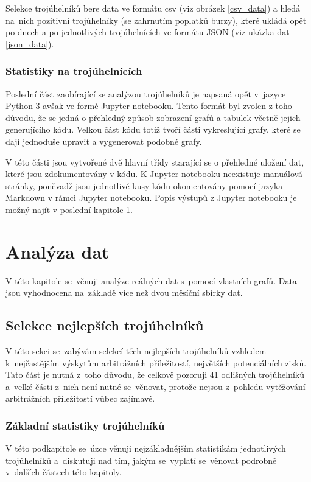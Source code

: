 \documentclass[thesis=B,czech]{FITthesis}[2019/03/21]
\begin{document}
Selekce trojúhelníků bere data ve formátu csv (viz obrázek \ref{csv_data}) a hledá na~nich pozitivní trojúhelníky (se zahrnutím poplatků burzy), které ukládá opět po dnech a po jednotlivých trojúhelnících ve formátu JSON (viz ukázka dat \ref{json_data}).

\subsection{Statistiky na trojúhelnících}
Poslední část zaobírající se analýzou trojúhelníků je napsaná opět v~jazyce Python 3 avšak ve formě Jupyter notebooku. Tento formát byl zvolen z toho důvodu, že se jedná o přehledný způsob zobrazení grafů a tabulek včetně jejich generujícího kódu. Velkou část kódu totiž tvoří části vykreslující grafy, které se dají jednoduše upravit a vygenerovat podobné grafy.

V této části jsou vytvořené dvě hlavní třídy starající se o přehledné uložení dat, které jsou zdokumentovány v kódu. K Jupyter notebooku neexistuje manuálová stránky, poněvadž jsou jednotlivé kusy kódu okomentovány pomocí jazyka Markdown v rámci Jupyter notebooku. Popis výstupů z Jupyter notebooku je možný najít v poslední kapitole \ref{chapter:analyza_dat}.



\chapter{Analýza dat}
\label{chapter:analyza_dat}
V této kapitole se~věnuji analýze  reálných dat s~pomocí vlastních grafů. Data jsou vyhodnocena na~základě více než dvou měsíční sbírky dat.

\section{Selekce nejlepších trojúhelníků}
V této sekci se~zabývám selekcí těch nejlepších trojúhelníků vzhledem \linebreak k~nejčastějším výskytům arbitrážních příležitostí, největších potenciálních \linebreak zisků. Tato část je nutná z~toho důvodu, že celkově pozoruji 41 odlišných trojúhelníků a~velké části z~nich není nutné se~věnovat, protože nejsou z~pohledu vytěžování arbitrážních příležitostí vůbec zajímavé.

\subsection{Základní statistiky trojúhelníků}
V této podkapitole se~úzce věnuji nejzákladnějším statistikám jednotlivých trojúhelníků a~diskutuji nad tím, jakým se~vyplatí se~věnovat podrobně \linebreak v~dalších částech této kapitoly.
\end{document}
